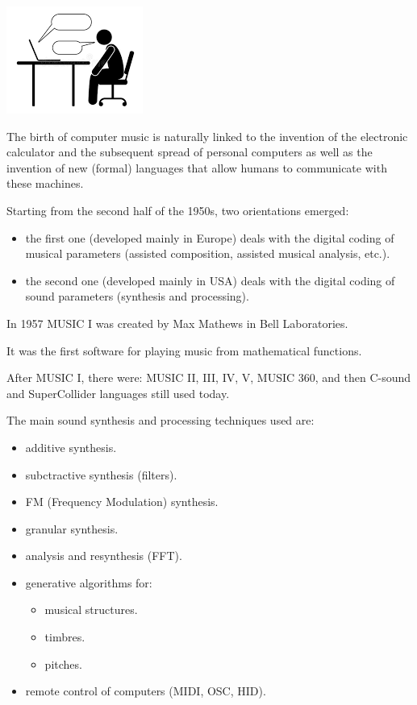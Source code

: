 \begin{center}
\includegraphics[scale=0.5]{../img/comp.png}
\end{center}

The birth of computer music is naturally linked to the invention of the electronic calculator and the subsequent spread of personal computers as well as the invention of new (formal) languages that allow humans to communicate with these machines.

Starting from the second half of the 1950s, two orientations emerged:

\begin{itemize}
\tightlist
\item the first one (developed mainly in Europe) deals with the digital coding of musical parameters (assisted composition, assisted musical analysis, etc.).
\item the second one (developed mainly in USA) deals with the digital coding of sound parameters (synthesis and processing).
\end{itemize}

In 1957 MUSIC I was created by Max Mathews in Bell Laboratories.

It was the first software for playing music from mathematical functions.

After MUSIC I, there were: MUSIC II, III, IV, V, MUSIC 360, and then C-sound and SuperCollider languages still used today.

The main sound synthesis and processing techniques used are:

\begin{itemize}
\tightlist
\item additive synthesis.
\item subctractive synthesis (filters).
\item FM (Frequency Modulation) synthesis.
\item granular synthesis.
\item analysis and resynthesis (FFT).
\item generative algorithms for:

  \begin{itemize} 
  \tightlist
  \item musical structures.
  \item timbres.
  \item pitches.
  \end{itemize}
\item remote control of computers (MIDI, OSC, HID).
\end{itemize}

